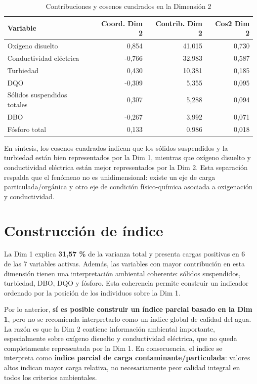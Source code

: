 \documentclass[12pt,letterpaper]{article}
\begin{document}
\begin{table}[H]
\centering
\caption{Contribuciones y cosenos cuadrados en la Dimensión 2}
\begin{tabular}{lrrr}
\toprule
\textbf{Variable} & \textbf{Coord. Dim 2} & \textbf{Contrib. Dim 2} & \textbf{Cos2 Dim 2} \\
\midrule
Oxígeno disuelto & 0,854 & 41,015 & 0,730 \\
Conductividad eléctrica & -0,766 & 32,983 & 0,587 \\
Turbiedad & 0,430 & 10,381 & 0,185 \\
DQO & -0,309 & 5,355 & 0,095 \\
Sólidos suspendidos totales & 0,307 & 5,288 & 0,094 \\
DBO & -0,267 & 3,992 & 0,071 \\
Fósforo total & 0,133 & 0,986 & 0,018 \\
\bottomrule
\end{tabular}
\end{table}

En síntesis, los cosenos cuadrados indican que los sólidos suspendidos y la turbiedad están bien representados por la Dim 1, mientras que oxígeno disuelto y conductividad eléctrica están mejor representados por la Dim 2. Esta separación respalda que el fenómeno no es unidimensional: existe un eje de carga particulada/orgánica y otro eje de condición físico-química asociada a oxigenación y conductividad.

\section{Construcción de índice}

La Dim 1 explica \textbf{31,57 \%} de la varianza total y presenta cargas positivas en 6 de las 7 variables activas. Además, las variables con mayor contribución en esta dimensión tienen una interpretación ambiental coherente: sólidos suspendidos, turbiedad, DBO, DQO y fósforo. Esta coherencia permite construir un indicador ordenado por la posición de los individuos sobre la Dim 1.

Por lo anterior, \textbf{sí es posible construir un índice parcial basado en la Dim 1}, pero no se recomienda interpretarlo como un índice global de calidad del agua. La razón es que la Dim 2 contiene información ambiental importante, especialmente sobre oxígeno disuelto y conductividad eléctrica, que no queda completamente representada por la Dim 1. En consecuencia, el índice se interpreta como \textbf{índice parcial de carga contaminante/particulada}: valores altos indican mayor carga relativa, no necesariamente peor calidad integral en todos los criterios ambientales.
\end{document}
